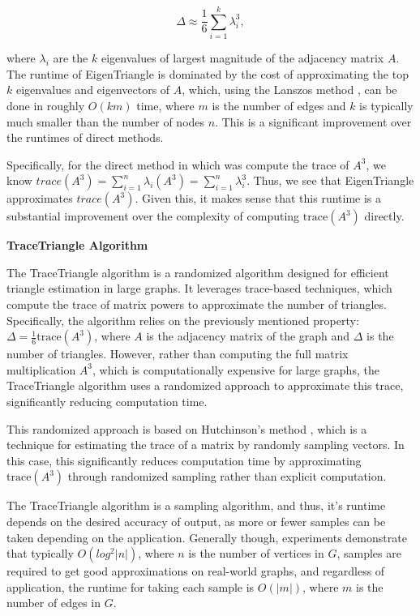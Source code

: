 \documentclass[11pt]{article}
\newcommand{\subsubsubsection}[1]{
  \vspace{1em} %
  \noindent\textbf{#1} %
  \vspace{0.5em} %
}
\begin{document}
\[
\Delta \approx \frac{1}{6} \sum_{i=1}^{k} \lambda_i^3,
\]

where $\lambda_i$ are the $k$ eigenvalues of largest magnitude of the adjacency matrix $A$.
The runtime of EigenTriangle is dominated by the cost of approximating the top $k$ eigenvalues and eigenvectors of $A$, which, using the Lanszos method \cite{cullum_lanczos_2002}, can be done in roughly $O(k m)$ time, where $m$ is the number of edges and $k$ is typically much smaller than the number of nodes $n$.
This is a significant improvement over the runtimes of direct methods.

Specifically, for the direct method in which was compute the trace of $A^3$, we know ${trace}(A^3) = \sum_{i = 1}^{n} \lambda_i(A^3) = \sum_{i = 1}^{n} \lambda_i^3$.
Thus, we see that EigenTriangle approximates ${trace}(A^3)$.
Given this, it makes sense that this runtime is a substantial improvement over the complexity of computing $\mathrm{trace}(A^3)$ directly.

\subsubsubsection{TraceTriangle Algorithm}

The TraceTriangle algorithm \cite{avron_counting_2010} is a randomized algorithm designed for efficient triangle estimation in large graphs.
It leverages trace-based techniques, which compute the trace of matrix powers to approximate the number of triangles.
Specifically, the algorithm relies on the previously mentioned property: $\Delta = \frac{1}{6} \mathrm{trace}(A^3)$, where $A$ is the adjacency matrix of the graph and $\Delta$ is the number of triangles.
However, rather than computing the full matrix multiplication $A^3$, which is computationally expensive for large graphs, the TraceTriangle algorithm uses a randomized approach to approximate this trace, significantly reducing computation time.

This randomized approach is based on Hutchinson's method \cite{hutchinson_stochastic_1990}, which is a technique for estimating the trace of a matrix by randomly sampling vectors.
In this case, this significantly reduces computation time by approximating $\mathrm{trace}(A^3)$ through randomized sampling rather than explicit computation.

The TraceTriangle algorithm is a sampling algorithm, and thus, it's runtime depends on the desired accuracy of output, as more or fewer samples can be taken depending on the application.
Generally though, experiments demonstrate that typically $O(log^2|n|)$, where $n$ is the number of vertices in $G$, samples are required to get good approximations on real-world graphs, and regardless of application, the runtime for taking each sample is $O(|m|)$, where $m$ is the number of edges in $G$.
\end{document}
